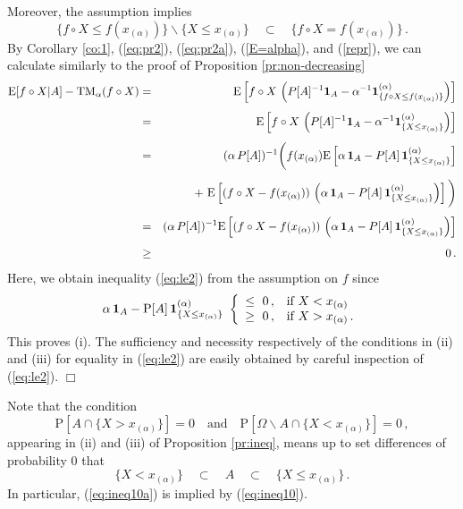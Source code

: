 \documentclass[11pt,a4paper,leqno]{article}
\begin{document}
Moreover, the assumption implies 
\begin{equation}\label{eq:pr2a}
\{f\circ X \le f(x_{(\alpha)})\}\backslash \{X \le x_{(\alpha)}\}
\quad \subset \quad \{f\circ X = f(x_{(\alpha)})\}\,.
\end{equation}
By Corollary \ref{co:1}, (\ref{eq:pr2}), (\ref{eq:pr2a}), 
(\ref{E=alpha}), and (\ref{repr}), we can calculate similarly 
to the proof of Proposition \ref{pr:non-decreasing} 
\begin{eqnarray}
\mathrm{E}[ f\circ X| A ] - \mathrm{TM}_\alpha(f\circ X)   &=&
\mathrm{E}
\left[ 
f\circ X \,
\left(
P[A]^{-1}
{\bf 1}_{A} -
\alpha^{-1}
{\bf 1}_{\{f\circ X\leq f(x_{(\alpha)})\}}^{(\alpha)} 
\right)
\right]\nonumber\\[1ex]
&=&
\mathrm{E}
\left[ 
f\circ X \,
\left(
P[A]^{-1}
{\bf 1}_{A} -
\alpha^{-1}
{\bf 1}_{\{ X\leq x_{(\alpha)}\}}^{(\alpha)} 
\right)
\right]\nonumber\\[1ex]
& = & (\alpha \,P[A])^{-1} \bigg( f(x_{(\alpha)})
\mathrm{E}
\left[ 
\alpha \,
{\bf 1}_{A} - P[A]
 \,
{\bf 1}_{\{X\leq x_{(\alpha)}\}}^{(\alpha)} 
\right] \nonumber\\[1ex]
& & \quad +\
\mathrm{E}
\left[ 
(f\circ X - f(x_{(\alpha)})) \,
\left(
\alpha \,
{\bf 1}_{A} - P[A]
 \,
{\bf 1}_{\{X\leq x_{(\alpha)}\}}^{(\alpha)} 
\right)
\right]\bigg)\nonumber\\[1ex]
& = & (\alpha \,P[A])^{-1} 
\mathrm{E}
\left[
(f\circ X - f(x_{(\alpha)})) \,
\left( 
\alpha \,
{\bf 1}_{A} - P[A]
 \,
{\bf 1}_{\{X\leq x_{(\alpha)}\}}^{(\alpha)} 
\right)
\right] \nonumber\\[1ex]
&\geq& 
0\,.
  \label{eq:le2}
\end{eqnarray}
%
Here, we obtain inequality (\ref{eq:le2}) from the assumption on $f$ since
\begin{equation}
\alpha \,
{\bf 1}_A - 
\mathrm{P}[A] \,
{\bf 1}_{\{X\leq x_{(\alpha)}\}}^{(\alpha)} 
\  
\left\{
\begin{array}{c@{\,,\quad}l}
\leq\ 0 & \mbox{if}\ X<x_{(\alpha)} \\ 
\geq\ 0 & \mbox{if}\ X>x_{(\alpha)}\,.
\end{array}
\right.
  \label{eq:le3}
\end{equation}
This proves (i). The sufficiency and necessity respectively of the conditions
in (ii) and (iii) for equality in (\ref{eq:le2}) are easily obtained by
careful inspection
of (\ref{eq:le2}).
\hfill $\Box$

Note that the condition
\begin{equation}\label{eq:ineq10a} 
\mathrm{P}[A\cap \{X > x_{(\alpha)}\}] = 0 \quad \mbox{and}\quad
 \mathrm{P}[\Omega \backslash A \cap \{X <
x_{(\alpha)}\}] = 0\,,
\end{equation}
appearing in (ii) and (iii) of Proposition \ref{pr:ineq}, means up to
set differences of probability 0 that
\begin{equation}
\{ X < x_{(\alpha)}\} \quad \subset \quad A \quad \subset \quad \{ X \le x_{(\alpha)}\}\,.
\label{eq:ineq10}
\end{equation}
In particular, (\ref{eq:ineq10a}) is implied by (\ref{eq:ineq10}).
\end{document}
